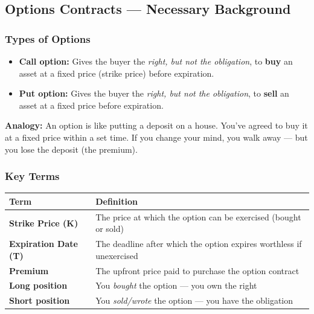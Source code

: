 \documentclass[12pt,openany]{book}
\begin{document}
\subsection{Options Contracts — Necessary Background}

\subsubsection{Types of Options}

\begin{itemize}[leftmargin=*]
    \item \textbf{Call option:} Gives the buyer the \emph{right, but not the obligation}, to \textbf{buy} an asset at a fixed price (strike price) before expiration.
    \item \textbf{Put option:} Gives the buyer the \emph{right, but not the obligation}, to \textbf{sell} an asset at a fixed price before expiration.
\end{itemize}

\textbf{Analogy:} An option is like putting a deposit on a house. You've agreed to buy it at a fixed price within a set time. If you change your mind, you walk away — but you lose the deposit (the premium).

\subsubsection{Key Terms}

\begin{center}
\scriptsize
\setlength{\tabcolsep}{3pt}
\begin{tabular}{|L{6.3cm}|L{6.3cm}|}
\hline
\textbf{Term} & \textbf{Definition} \\
\hline
\textbf{Strike Price (K)} & The price at which the option can be exercised (bought or sold) \\
\hline
\textbf{Expiration Date (T)} & The deadline after which the option expires worthless if unexercised \\
\hline
\textbf{Premium} & The upfront price paid to purchase the option contract \\
\hline
\textbf{Long position} & You \emph{bought} the option — you own the right \\
\hline
\textbf{Short position} & You \emph{sold/wrote} the option — you have the obligation \\
\hline
\end{tabular}
\end{center}
\end{document}
